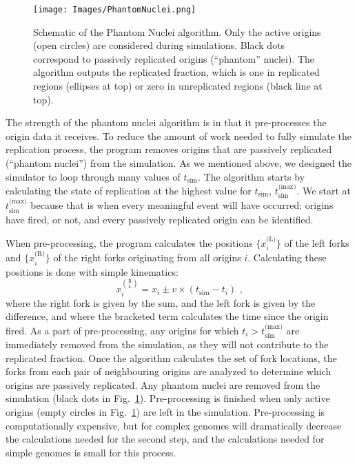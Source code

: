 		\begin{figure}[tbh]
			\begin{center}
				\texttt{[image: Images/PhantomNuclei.png]}
			\end{center}
				\caption[Phantom Nuclei Illustration]{\label{fig:phantom} Schematic of the Phantom Nuclei algorithm.
				Only the active origins (open circles) are considered during simulations.
				Black dots correspond to passively replicated origins (``phantom'' nuclei).
				The algorithm outputs the replicated fraction, which is one in replicated regions (ellipses at top) or zero in unreplicated regions (black line at top).
				}
		\end{figure}
			
		The strength of the phantom nuclei algorithm is in that it pre-processes the origin data it receives.
		To reduce the amount of work needed to fully simulate the replication process, the program removes origins that are passively replicated (``phantom nuclei'') from the simulation.
		As we mentioned above, we designed the simulator to loop through many values of $t_\text{sim}$.
		The algorithm starts by calculating the state of replication at the highest value for $t_\text{sim}$, $t_\text{sim}^\text{(max)}$.
		We start at $t_\text{sim}^\text{(max)}$ because that is when every meaningful event will have occurred: origins have fired, or not, and every passively replicated origin can be identified.
		
		When pre-processing, the program calculates the positions $\{x_i^\text{(L)}\}$ of the left forks and $\{x_i^\text{(R)}\}$ of the right forks originating from all origins $i$.
		Calculating these positions is done with simple kinematics:
		\begin{equation} \label{eq:findforks}
			x_i^{\binom{\text{R}}{\text{L}}} = x_i \pm v \times \left( t_\text{sim} - t_i\right) \text{ ,}
		\end{equation}
		where the right fork is given by the sum, and the left fork is given by the difference, and where the bracketed term calculates the time since the origin fired.
		As a part of pre-processing, any origins for which $t_i > t_\text{sim}^\text{(max)}$ are immediately removed from the simulation, as they will not contribute to the replicated fraction.
		Once the algorithm calculates the set of fork locations, the forks from each pair of neighbouring origins are analyzed to determine which origins are passively replicated.
		Any phantom nuclei are removed from the simulation (black dots in Fig.~\ref{fig:phantom}).
		Pre-processing is finished when only active origins (empty circles in Fig.~\ref{fig:phantom}) are left in the simulation.
		Pre-processing is computationally expensive, but for complex genomes will dramatically decrease the calculations needed for the second step, and the calculations needed for simple genomes is small for this process.
		
